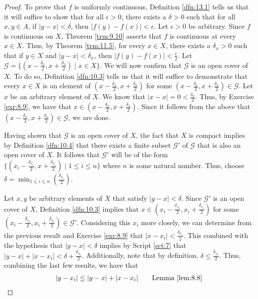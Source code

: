 \documentclass[../main.tex]{subfiles}
\begin{document}
\begin{theorem}
\begin{proof}
        To prove that $f$ is uniformly continuous, Definition \ref{dfn:13.1} tells us that it will suffice to show that for all $\epsilon>0$, there exists a $\delta>0$ such that for all $x,y\in A$, if $|y-x|<\delta$, then $|f(y)-f(x)|<\epsilon$. Let $\epsilon>0$ be arbitrary. Since $f$ is continuous on $X$, Theorem \ref{trm:9.10} asserts that $f$ is continuous at every $x\in X$. Thus, by Theorem \ref{trm:11.5}, for every $x\in X$, there exists a $\delta_x>0$ such that if $y\in X$ and $|y-x|<\delta_x$, then $|f(y)-f(x)|<\frac{\epsilon}{2}$. Let $\mathcal{G}=\{(x-\frac{\delta_x}{2},x+\frac{\delta_x}{2})\mid x\in X\}$. We will now confirm that $\mathcal{G}$ is an open cover of $X$. To do so, Definition \ref{dfn:10.3} tells us that it will suffice to demonstrate that every $x\in X$ is an element of $(x-\frac{\delta_x}{2},x+\frac{\delta_x}{2})$ for some $(x-\frac{\delta_x}{2},x+\frac{\delta_x}{2})\in\mathcal{G}$. Let $x$ be an arbitrary element of $X$. We know that $|x-x|=0<\frac{\delta_x}{2}$. Thus, by Exercise \ref{exr:8.9}, we have that $x\in(x-\frac{\delta_x}{2},x+\frac{\delta_x}{2})$. Since it follows from the above that $(x-\frac{\delta_x}{2},x+\frac{\delta_x}{2})\in\mathcal{G}$, we are done.\par
        Having shown that $\mathcal{G}$ is an open cover of $X$, the fact that $X$ is compact implies by Definition \ref{dfn:10.4} that there exists a finite subset $\mathcal{G}'$ of $\mathcal{G}$ that is also an open cover of $X$. It follows that $\mathcal{G}'$ will be of the form $\{(x_i-\frac{\delta_{x_i}}{2},x+\frac{\delta_{x_i}}{2})\mid 1\leq i\leq n\}$ where $n$ is some natural number. Thus, choose $\delta=\min_{1\leq i\leq n}(\frac{\delta_{x_i}}{2})$.\par
        Let $x,y$ be arbitrary elements of $X$ that satisfy $|y-x|<\delta$. Since $\mathcal{G}'$ is an open cover of $X$, Definition \ref{dfn:10.3} implies that $x\in(x_i-\frac{\delta_{x_i}}{2},x_i+\frac{\delta_{x_i}}{2})$ for some $(x_i-\frac{\delta_{x_i}}{2},x_i+\frac{\delta_{x_i}}{2})\in\mathcal{G}'$. Considering this $x_i$ more closely, we can determine from the previous result and Exercise \ref{exr:8.9} that $|x-x_i|<\frac{\delta_{x_i}}{2}$. This combined with the hypothesis that $|y-x|<\delta$ implies by Script \ref{sct:7} that $|y-x|+|x-x_i|<\delta+\frac{\delta_{x_i}}{2}$. Additionally, note that by definition, $\delta\leq\frac{\delta_{x_i}}{2}$. Thus, combining the last few results, we have that
        \begin{align*}
            |y-x_i| &\leq |y-x|+|x-x_i|\tag*{Lemma \ref{lem:8.8}}\\

\end{align*}
\end{proof}
\end{theorem}
\end{document}
